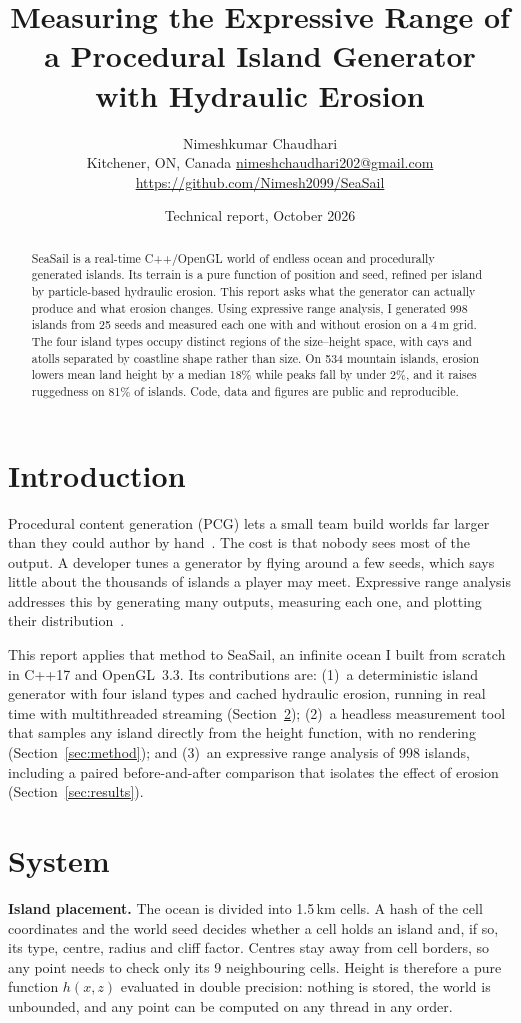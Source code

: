 \documentclass[10pt,twocolumn]{article}
\title{\vspace{-0.6in}\Large\bfseries Measuring the Expressive Range of a Procedural Island Generator with Hydraulic Erosion}
\author{Nimeshkumar Chaudhari\\\small Kitchener, ON, Canada \textperiodcentered{} \href{mailto:nimeshchaudhari202@gmail.com}{nimeshchaudhari202@gmail.com} \textperiodcentered{} \url{https://github.com/Nimesh2099/SeaSail}}
\date{\small Technical report, October 2026}
\begin{document}
\maketitle
\begin{abstract}
\noindent SeaSail is a real-time C++/OpenGL world of endless ocean and procedurally generated islands. Its terrain is a pure function of position and seed, refined per island by particle-based hydraulic erosion. This report asks what the generator can actually produce and what erosion changes. Using expressive range analysis, I generated 998 islands from 25 seeds and measured each one with and without erosion on a 4\,m grid. The four island types occupy distinct regions of the size--height space, with cays and atolls separated by coastline shape rather than size. On 534 mountain islands, erosion lowers mean land height by a median 18\% while peaks fall by under 2\%, and it raises ruggedness on 81\% of islands. Code, data and figures are public and reproducible.
\end{abstract}

\section{Introduction}
Procedural content generation (PCG) lets a small team build worlds far larger than they could author by hand~\cite{shaker}. The cost is that nobody sees most of the output. A developer tunes a generator by flying around a few seeds, which says little about the thousands of islands a player may meet. Expressive range analysis addresses this by generating many outputs, measuring each one, and plotting their distribution~\cite{smith}.

This report applies that method to SeaSail, an infinite ocean I built from scratch in C++17 and OpenGL~3.3. Its contributions are:
(1)~a deterministic island generator with four island types and cached hydraulic erosion, running in real time with multithreaded streaming (Section~\ref{sec:system});
(2)~a headless measurement tool that samples any island directly from the height function, with no rendering (Section~\ref{sec:method}); and
(3)~an expressive range analysis of 998 islands, including a paired before-and-after comparison that isolates the effect of erosion (Section~\ref{sec:results}).

\section{System}\label{sec:system}
\textbf{Island placement.} The ocean is divided into 1.5\,km cells. A hash of the cell coordinates and the world seed decides whether a cell holds an island and, if so, its type, centre, radius and cliff factor. Centres stay away from cell borders, so any point needs to check only its 9 neighbouring cells. Height is therefore a pure function $h(x,z)$ evaluated in double precision: nothing is stored, the world is unbounded, and any point can be computed on any thread in any order.
\end{document}
